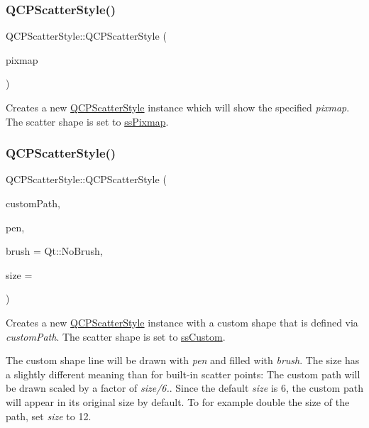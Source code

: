 \subsubsection{\texorpdfstring{QCPScatterStyle()}{QCPScatterStyle()}\hspace{0.1cm}{\footnotesize\ttfamily [6/7]}}
{\footnotesize\ttfamily Q\+C\+P\+Scatter\+Style\+::\+Q\+C\+P\+Scatter\+Style (\begin{DoxyParamCaption}\item[{const Q\+Pixmap \&}]{pixmap }\end{DoxyParamCaption})}

Creates a new \mbox{\hyperlink{class_q_c_p_scatter_style}{Q\+C\+P\+Scatter\+Style}} instance which will show the specified {\itshape pixmap}. The scatter shape is set to \mbox{\hyperlink{class_q_c_p_scatter_style_adb31525af6b680e6f1b7472e43859349a8718b849ca7c307b07b8e091efb0c31e}{ss\+Pixmap}}. \mbox{\label{class_q_c_p_scatter_style_a879c30647683b3cfbde2afecea815e6f}} 
\subsubsection{\texorpdfstring{QCPScatterStyle()}{QCPScatterStyle()}\hspace{0.1cm}{\footnotesize\ttfamily [7/7]}}
{\footnotesize\ttfamily Q\+C\+P\+Scatter\+Style\+::\+Q\+C\+P\+Scatter\+Style (\begin{DoxyParamCaption}\item[{const Q\+Painter\+Path \&}]{custom\+Path,  }\item[{const Q\+Pen \&}]{pen,  }\item[{const Q\+Brush \&}]{brush = {\ttfamily Qt\+:\+:NoBrush},  }\item[{double}]{size = {} }\end{DoxyParamCaption})}

Creates a new \mbox{\hyperlink{class_q_c_p_scatter_style}{Q\+C\+P\+Scatter\+Style}} instance with a custom shape that is defined via {\itshape custom\+Path}. The scatter shape is set to \mbox{\hyperlink{class_q_c_p_scatter_style_adb31525af6b680e6f1b7472e43859349a15d9bcfd9de94edda949006529f9219d}{ss\+Custom}}.

The custom shape line will be drawn with {\itshape pen} and filled with {\itshape brush}. The size has a slightly different meaning than for built-\/in scatter points\+: The custom path will be drawn scaled by a factor of {\itshape size/6.}. Since the default {\itshape size} is 6, the custom path will appear in its original size by default. To for example double the size of the path, set {\itshape size} to 12. 

